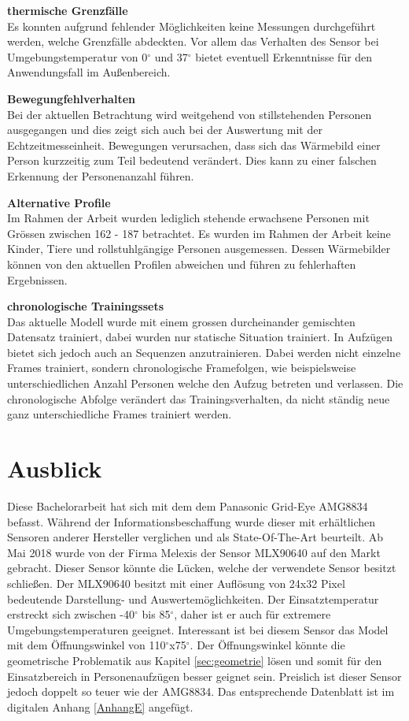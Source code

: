 \textbf{thermische Grenzfälle}\\
Es konnten aufgrund fehlender Möglichkeiten keine Messungen durchgeführt werden, welche Grenzfälle abdeckten. Vor allem das Verhalten des Sensor bei Umgebungstemperatur von 0$^\circ$ und 37$^\circ$ bietet eventuell Erkenntnisse für den Anwendungsfall im Außenbereich.

\textbf{Bewegungfehlverhalten}\\
Bei der aktuellen Betrachtung wird weitgehend von stillstehenden Personen ausgegangen und dies zeigt sich auch bei der Auswertung mit der Echtzeitmesseinheit. Bewegungen verursachen, dass sich das Wärmebild einer Person kurzzeitig zum Teil bedeutend verändert. Dies kann zu einer falschen Erkennung der Personenanzahl führen. 

\textbf{Alternative Profile}\\
Im Rahmen der Arbeit wurden lediglich stehende erwachsene Personen mit Grössen zwischen 162 - 187 betrachtet. Es wurden im Rahmen der Arbeit keine Kinder, Tiere und rollstuhlgängige Personen ausgemessen. Dessen Wärmebilder können von den aktuellen Profilen abweichen und führen zu fehlerhaften Ergebnissen.

\textbf{chronologische Trainingssets}\\
Das aktuelle Modell wurde mit einem grossen durcheinander gemischten Datensatz trainiert, dabei wurden nur statische Situation trainiert. In Aufzügen bietet sich jedoch auch an Sequenzen anzutrainieren. Dabei werden nicht einzelne Frames trainiert, sondern chronologische Framefolgen, wie beispielsweise unterschiedlichen Anzahl Personen welche den Aufzug betreten und verlassen. Die chronologische Abfolge verändert das Trainingsverhalten, da nicht ständig neue ganz unterschiedliche Frames trainiert werden.

\section{Ausblick}

Diese Bachelorarbeit hat sich mit dem dem Panasonic Grid-Eye AMG8834 befasst. Während der Informationsbeschaffung wurde dieser mit erhältlichen Sensoren anderer Hersteller verglichen und als State-Of-The-Art beurteilt.  
Ab Mai 2018 wurde von der Firma Melexis der Sensor MLX90640 auf den Markt gebracht. Dieser Sensor könnte die Lücken, welche der verwendete Sensor besitzt schließen. Der MLX90640 besitzt mit einer Auflösung von 24x32 Pixel bedeutende Darstellung- und Auswertemöglichkeiten. Der Einsatztemperatur erstreckt sich zwischen -40$^\circ$ bis 85$^\circ$, daher ist er auch für extremere Umgebungstemperaturen geeignet. Interessant ist bei diesem Sensor das Model mit dem Öffnungswinkel von 110$^\circ$x75$^\circ$. Der Öffnungswinkel könnte die geometrische Problematik aus Kapitel \ref{sec:geometrie} lösen und somit für den Einsatzbereich in Personenaufzügen besser geignet sein. Preislich ist dieser Sensor jedoch doppelt so teuer wie der AMG8834. Das entsprechende Datenblatt ist im digitalen Anhang \ref{AnhangE} angefügt. 




